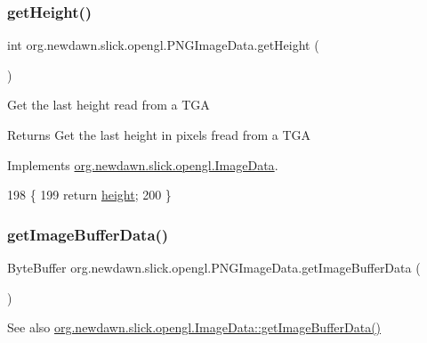 \subsubsection{\texorpdfstring{get\+Height()}{getHeight()}}
{\footnotesize\ttfamily int org.\+newdawn.\+slick.\+opengl.\+P\+N\+G\+Image\+Data.\+get\+Height (\begin{DoxyParamCaption}{ }\end{DoxyParamCaption})\hspace{0.3cm}{\ttfamily [inline]}}

Get the last height read from a T\+GA

\begin{DoxyReturn}{Returns}
Get the last height in pixels fread from a T\+GA 
\end{DoxyReturn}


Implements \mbox{\hyperlink{interfaceorg_1_1newdawn_1_1slick_1_1opengl_1_1_image_data_acce23925ae561e75f051d3287a8dda06}{org.\+newdawn.\+slick.\+opengl.\+Image\+Data}}.


\begin{DoxyCode}
198                            \{
199         \textcolor{keywordflow}{return} \mbox{\hyperlink{classorg_1_1newdawn_1_1slick_1_1opengl_1_1_p_n_g_image_data_a710f967c33c6af6902136406cffc1290}{height}};
200     \}
\end{DoxyCode}
\mbox{\label{classorg_1_1newdawn_1_1slick_1_1opengl_1_1_p_n_g_image_data_abde9855e2ad874c293a3be32494aeee5}} 
\subsubsection{\texorpdfstring{get\+Image\+Buffer\+Data()}{getImageBufferData()}}
{\footnotesize\ttfamily Byte\+Buffer org.\+newdawn.\+slick.\+opengl.\+P\+N\+G\+Image\+Data.\+get\+Image\+Buffer\+Data (\begin{DoxyParamCaption}{ }\end{DoxyParamCaption})\hspace{0.3cm}{\ttfamily [inline]}}

\begin{DoxySeeAlso}{See also}
\mbox{\hyperlink{interfaceorg_1_1newdawn_1_1slick_1_1opengl_1_1_image_data_a7b15d49f552cad075bb1179668ce5250}{org.\+newdawn.\+slick.\+opengl.\+Image\+Data\+::get\+Image\+Buffer\+Data()}} 
\end{DoxySeeAlso}


